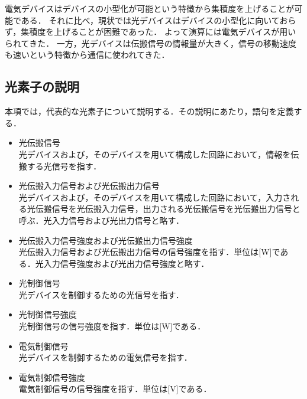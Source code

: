 電気デバイスはデバイスの小型化が可能という特徴から集積度を上げることが可能である．
それに比べ，現状では光デバイスはデバイスの小型化に向いておらず，集積度を上げることが困難であった．
よって演算には電気デバイスが用いられてきた．
一方，光デバイスは伝搬信号の情報量が大きく，信号の移動速度も速いという特徴から通信に使われてきた．

\subsection{光素子の説明}
本項では，代表的な光素子について説明する．その説明にあたり，語句を定義する．
\begin{itemize}
\item 光伝搬信号\\
光デバイスおよび，そのデバイスを用いて構成した回路において，情報を伝搬する光信号を指す．
\item 光伝搬入力信号および光伝搬出力信号\\
光デバイスおよび，そのデバイスを用いて構成した回路において，入力される光伝搬信号を光伝搬入力信号，出力される光伝搬信号を光伝搬出力信号と呼ぶ．光入力信号および光出力信号と略す．
\item 光伝搬入力信号強度および光伝搬出力信号強度\\
光伝搬入力信号および光伝搬出力信号の信号強度を指す．単位は[W]である．光入力信号強度および光出力信号強度と略す．
\item 光制御信号\\
光デバイスを制御するための光信号を指す．
\item 光制御信号強度\\
光制御信号の信号強度を指す．単位は[W]である．
\item 電気制御信号\\
光デバイスを制御するための電気信号を指す．
\item 電気制御信号強度\\
電気制御信号の信号強度を指す．単位は[V]である．
\end{itemize}

